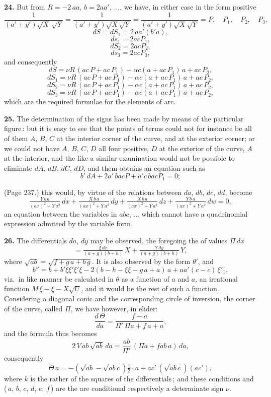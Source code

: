 \documentclass[11pt,a4paper]{book}
\begin{document}
\medskip

\noindent\textbf{24.} But from $R = -2\,a a$, $b = 2 a a'$, $\ldots$, we have, in either case in the form positive
\[
\frac{1}{(a' + y')\sqrt{X}\,\sqrt{Y}} = \frac{1}{(a' + y')\sqrt{X}\sqrt{Y}} = \frac{1}{(a' + y')\sqrt{X}\sqrt{Y}} = P, \quad P_1,\quad P_2,\quad P_3,
\]
\[
dS = dS_1 = 2\,a a' (b' a),
\]
\[
ds_1 = 2 a c P_1,
\]
\[
dS_2 = 2 a c P_2,
\]
\[
ds_3 = 2 a c P_3,
\]
and consequently
\[
d S = \nu R\,(a c\,P + a c\,P_1) - \alpha c (a + a c\,P_1)\,a + a c\,P_2,
\]
\[
dS_1 = \nu R\,(a c\,P + a c\,P_1) - \alpha c (a + a c\,P_1)\,a + a c\,P_2,
\]
\[
dS_2 = \nu R\,(a c\,P + a c\,P_1) - \alpha c (a + a c\,P_1)\,a + a c\,P_2,
\]
\[
dS_3 = \nu R\,(a c\,P + a c\,P_1) - \alpha c (a + a c\,P_1)\,a + a c\,P_2,
\]
which are the required formulae for the elements of arc.

\medskip

\noindent\textbf{25.} The determination of the signs has been made by means of the particular figure\,: but it is easy to see that the points of terms could not for instance be all of them $A$, $B$, $C$ at the interior corner of the curve, and at the exterior corner; or we could not have $A$, $B$, $C$, $D$ all four positive, $D$ at the exterior of the curve, $A$ at the interior, and the like a similar examination would not be possible to eliminate $dA$, $dB$, $dC$, $dD$, and them obtains an equation such as
\[
b'\,dA + 2 a'\,b a c P + a' c\,b a c P_1 = 0;
\]

\medskip

\noindent (Page 237.) this would, by virtue of the relations between $da$, $db$, $dc$, $dd$, become
\[
\tfrac{Y\,b\,a}{(a x)^2 + Y\,a^2}\,dx + \tfrac{X\,b\,a}{(a x)^2 + Y\,a^2}\,dy + \tfrac{X\,b\,a}{(a x)^2 + Y\,a^2}\,dz + \tfrac{Y\,b\,a}{(a x)^2 + Y\,a^2}\,dw = 0,
\]
an equation between the variables in $abc$, $\ldots$ which cannot have a quadrinomial expression admitted by the variable form.

\medskip

\noindent\textbf{26.} The differentials $da$, $dy$ may be observed, the foregoing the of values $\Pi\,dx$
\[
= \tfrac{\xi\,d x}{(a + g)(b + h)} \,X + \tfrac{Y\,d y}{(a + g)(b + h)}\,Y,
\]
where $\sqrt{a b} = \sqrt{f + g\,a + b\,g}$. It is also observed by the form $\theta'$, and
\[
b'' = b + b'\xi\xi'\xi'\xi - 2(b - h - \xi\xi - g\,a + a)\,a + a a'(c - c)\,\xi'_1,
\]
viz.\ in like manner be calculated in $\theta$ as a function of $a$ and $a$, an irrational function $M\,\xi - \xi - X\sqrt{U}$, and it would be the rest of such a function. Considering a diagonal conic and the corresponding circle of inversion, the corner of the curve, called $\Pi$, we have however, in elider:
\[
\frac{d\,\Theta}{d a} = \frac{f - a}{\Pi'\,\Pi a + f\,a + a},
\]
and the formula thus becomes
\[
2\,V\,a b\,\sqrt{a b}\,da = \frac{a b}{\Pi'}\,(\Pi a + f a b\,a)\,da,
\]
consequently
\[
\Theta\,a = - (\sqrt{a b} - \sqrt{a b\,c})\tfrac{1}{2} \cdot a + a c'\,(\sqrt{a b\,c}) (a c'),
\]
where $k$ is the rather of the squares of the differentials\,; and these conditions and (\,$a$, $b$, $c$, $d$, $e$, $f$\,) are the are conditional respectively a determinate sign $\nu$.
\end{document}
